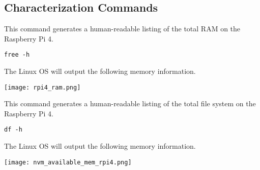 \documentclass[journal]{IEEEtran}
\begin{document}
\begin{enumerate}
    \subsection{Characterization Commands}

    This command generates a human-readable listing of the total RAM on the Raspberry Pi 4.
    \begin{lstlisting}[frame=single]
        free -h
    \end{lstlisting}


    The Linux OS will output the following memory information. \newline
    
    \texttt{[image: rpi4\_ram.png]}

    This command generates a human-readable listing of the total file system on the Raspberry Pi 4.
    \begin{lstlisting}[frame=single]
        df -h
    \end{lstlisting}


    The Linux OS will output the following memory information. \newline
    
    \texttt{[image: nvm\_available\_mem\_rpi4.png]}

    \end{enumerate}
\end{document}
